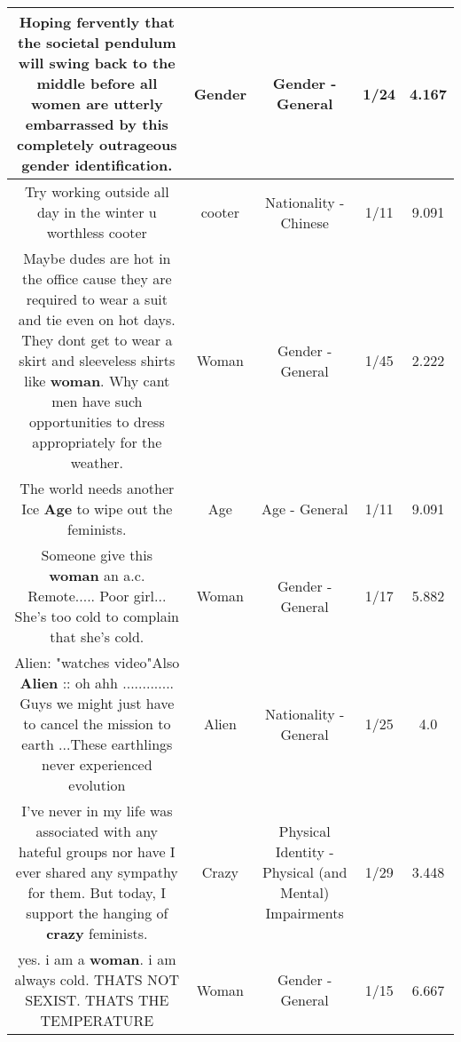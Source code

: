 \documentclass[11pt]{article}
\newlength\mylength
\begin{document}
\begin{center}
\begin{longtable}{|C{.65\mylength}|C{.30\mylength}|C{.12\mylength}|C{.12\mylength}|C{.12\mylength}|}
  \small Hoping fervently that the societal pendulum will swing back to the middle before all women are utterly embarrassed by this completely outrageous \textbf{gender} identification.\normalsize   & Gender & Gender - General & 1/24 & 4.167 \\  \hline
  \small Try working outside all day in the winter u worthless cooter\normalsize   & cooter & Nationality - Chinese & 1/11 & 9.091 \\  \hline
  \small Maybe dudes are hot in the office cause they are required to wear a suit and tie even on hot days. They dont get to wear a skirt and sleeveless shirts like \textbf{woman}.  Why cant men have such opportunities to dress appropriately for the weather.\normalsize   & Woman & Gender - General & 1/45 & 2.222 \\  \hline
  \small The world needs another Ice \textbf{Age} to wipe out the feminists.\normalsize   & Age & Age - General & 1/11 & 9.091 \\  \hline
  \small Someone give this \textbf{woman} an a.c. Remote..... Poor girl... She's too cold to complain that she's cold.\normalsize   & Woman & Gender - General & 1/17 & 5.882 \\  \hline
  \small Alien: "watches video"Also \textbf{Alien} :: oh ahh ............. Guys we might just have to cancel the mission to earth ...These earthlings never experienced evolution\normalsize   & Alien & Nationality - General & 1/25 & 4.0 \\  \hline
  \small I've never in my life was associated with any hateful groups nor have I ever shared any sympathy for them. But today, I support the hanging of \textbf{crazy} feminists.\normalsize   & Crazy & Physical Identity - Physical (and Mental) Impairments & 1/29 & 3.448 \\  \hline
  \small yes. i am a \textbf{woman}. i am always cold. THATS NOT SEXIST. THATS THE TEMPERATURE\normalsize   & Woman & Gender - General & 1/15 & 6.667 \\  \hline

\end{longtable}
\end{center}
\end{document}
